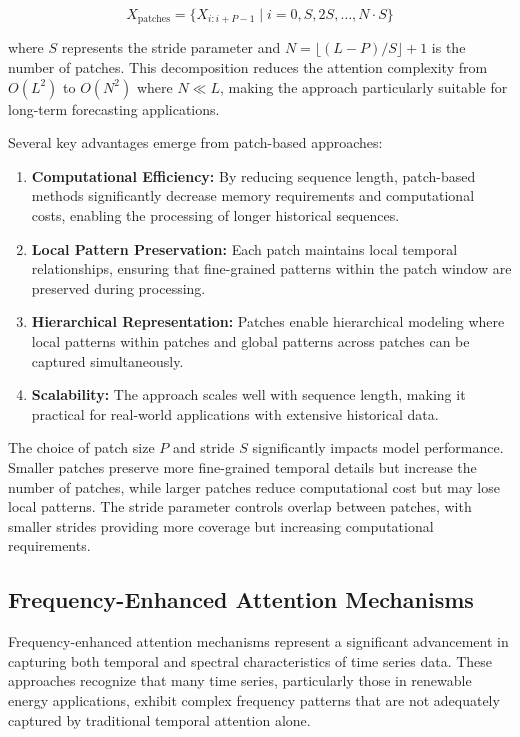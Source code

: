 \documentclass[12pt]{uomthesis}
\begin{document}
\begin{equation}
X_{\text{patches}} = \{X_{i:i+P-1} \mid i = 0, S, 2S, \ldots, N \cdot S\}
\end{equation}

where $S$ represents the stride parameter and $N = \lfloor (L-P)/S \rfloor + 1$ is the number of patches. This decomposition reduces the attention complexity from $O(L^2)$ to $O(N^2)$ where $N \ll L$, making the approach particularly suitable for long-term forecasting applications.

Several key advantages emerge from patch-based approaches:

\begin{enumerate}
\item \textbf{Computational Efficiency:} By reducing sequence length, patch-based methods significantly decrease memory requirements and computational costs, enabling the processing of longer historical sequences.

\item \textbf{Local Pattern Preservation:} Each patch maintains local temporal relationships, ensuring that fine-grained patterns within the patch window are preserved during processing.

\item \textbf{Hierarchical Representation:} Patches enable hierarchical modeling where local patterns within patches and global patterns across patches can be captured simultaneously.

\item \textbf{Scalability:} The approach scales well with sequence length, making it practical for real-world applications with extensive historical data.
\end{enumerate}

The choice of patch size $P$ and stride $S$ significantly impacts model performance. Smaller patches preserve more fine-grained temporal details but increase the number of patches, while larger patches reduce computational cost but may lose local patterns. The stride parameter controls overlap between patches, with smaller strides providing more coverage but increasing computational requirements.

\subsection{Frequency-Enhanced Attention Mechanisms}

Frequency-enhanced attention mechanisms represent a significant advancement in capturing both temporal and spectral characteristics of time series data. These approaches recognize that many time series, particularly those in renewable energy applications, exhibit complex frequency patterns that are not adequately captured by traditional temporal attention alone.
\end{document}
